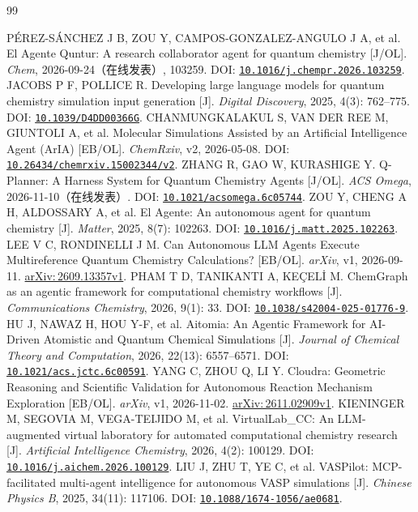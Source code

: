 \documentclass[UTF8,a4paper,11pt,fontset=fandol]{ctexart}
\newcommand{\doi}[1]{\href{https://doi.org/#1}{\nolinkurl{#1}}}
\newcommand{\ax}[1]{\href{https://arxiv.org/abs/#1}{arXiv:\,#1}}
\begin{document}
\begingroup
\small
\begin{thebibliography}{99}
\raggedright
\setlength{\itemsep}{.35em plus .1em}
  PÉREZ-SÁNCHEZ J B, ZOU Y, CAMPOS-GONZALEZ-ANGULO J A, et al.
  El Agente Quntur: A research collaborator agent for quantum chemistry [J/OL].
  \emph{Chem}, 2026-09-24（在线发表）, 103259.
  DOI: \doi{10.1016/j.chempr.2026.103259}.
  JACOBS P F, POLLICE R.
  Developing large language models for quantum chemistry simulation input generation [J].
  \emph{Digital Discovery}, 2025, 4(3): 762--775.
  DOI: \doi{10.1039/D4DD00366G}.
  CHANMUNGKALAKUL S, VAN DER REE M, GIUNTOLI A, et al.
  Molecular Simulations Assisted by an Artificial Intelligence Agent (ArIA) [EB/OL].
  \emph{ChemRxiv}, v2, 2026-05-08.
  DOI: \doi{10.26434/chemrxiv.15002344/v2}.
  ZHANG R, GAO W, KURASHIGE Y.
  Q-Planner: A Harness System for Quantum Chemistry Agents [J/OL].
  \emph{ACS Omega}, 2026-11-10（在线发表）.
  DOI: \doi{10.1021/acsomega.6c05744}.
  ZOU Y, CHENG A H, ALDOSSARY A, et al.
  El Agente: An autonomous agent for quantum chemistry [J].
  \emph{Matter}, 2025, 8(7): 102263.
  DOI: \doi{10.1016/j.matt.2025.102263}.
  LEE V C, RONDINELLI J M.
  Can Autonomous LLM Agents Execute Multireference Quantum Chemistry Calculations?
  [EB/OL].
  \emph{arXiv}, v1, 2026-09-11.
  \ax{2609.13357v1}.
  PHAM T D, TANIKANTI A, KEÇELİ M.
  ChemGraph as an agentic framework for computational chemistry workflows [J].
  \emph{Communications Chemistry}, 2026, 9(1): 33.
  DOI: \doi{10.1038/s42004-025-01776-9}.
  HU J, NAWAZ H, HOU Y-F, et al.
  Aitomia: An Agentic Framework for AI-Driven Atomistic and Quantum Chemical Simulations
  [J].
  \emph{Journal of Chemical Theory and Computation}, 2026, 22(13): 6557--6571.
  DOI: \doi{10.1021/acs.jctc.6c00591}.
  YANG C, ZHOU Q, LI Y.
  Cloudra: Geometric Reasoning and Scientific Validation for Autonomous Reaction Mechanism
  Exploration [EB/OL].
  \emph{arXiv}, v1, 2026-11-02.
  \ax{2611.02909v1}.
  KIENINGER M, SEGOVIA M, VEGA-TEIJIDO M, et al.
  VirtualLab\_CC: An LLM-augmented virtual laboratory for automated computational
  chemistry research [J].
  \emph{Artificial Intelligence Chemistry}, 2026, 4(2): 100129.
  DOI: \doi{10.1016/j.aichem.2026.100129}.
  LIU J, ZHU T, YE C, et al.
  VASPilot: MCP-facilitated multi-agent intelligence for autonomous VASP simulations [J].
  \emph{Chinese Physics B}, 2025, 34(11): 117106.
  DOI: \doi{10.1088/1674-1056/ae0681}.

\end{thebibliography}
\end{document}
